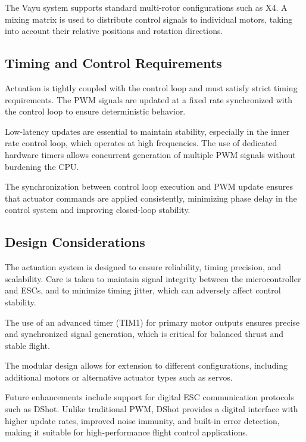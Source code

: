 The Vayu system supports standard multi-rotor configurations such as X4. A mixing matrix is used to distribute control signals to individual motors, taking into account their relative positions and rotation directions.

\subsection{Timing and Control Requirements}

Actuation is tightly coupled with the control loop and must satisfy strict timing requirements. The PWM signals are updated at a fixed rate synchronized with the control loop to ensure deterministic behavior.

Low-latency updates are essential to maintain stability, especially in the inner rate control loop, which operates at high frequencies. The use of dedicated hardware timers allows concurrent generation of multiple PWM signals without burdening the CPU.

The synchronization between control loop execution and PWM update ensures that actuator commands are applied consistently, minimizing phase delay in the control system and improving closed-loop stability.

\subsection{Design Considerations}

The actuation system is designed to ensure reliability, timing precision, and scalability. Care is taken to maintain signal integrity between the microcontroller and ESCs, and to minimize timing jitter, which can adversely affect control stability.

The use of an advanced timer (TIM1) for primary motor outputs ensures precise and synchronized signal generation, which is critical for balanced thrust and stable flight.

The modular design allows for extension to different configurations, including additional motors or alternative actuator types such as servos.

Future enhancements include support for digital ESC communication protocols such as DShot. Unlike traditional PWM, DShot provides a digital interface with higher update rates, improved noise immunity, and built-in error detection, making it suitable for high-performance flight control applications.